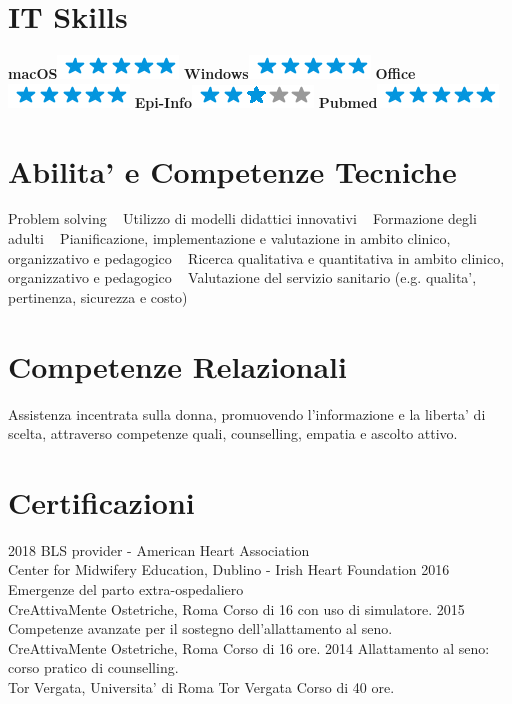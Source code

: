 \documentclass[11pt]{friggeri-cv}
\begin{document}
\begin{aside}
	\section{IT Skills}
	\textbf{macOS}\includegraphics[scale=0.40]{img/5stars.png}
	\textbf{Windows}\includegraphics[scale=0.40]{img/5stars.png}
	\textbf{Office}\includegraphics[scale=0.40]{img/5stars.png}
	\textbf{Epi-Info}\includegraphics[scale=0.40]{img/3stars.png}
	\textbf{Pubmed}\includegraphics[scale=0.40]{img/5stars.png}
  \section{Abilita' e Competenze Tecniche}
  \small Problem solving 
    ~
    Utilizzo di modelli didattici innovativi
    ~
    Formazione degli adulti
    ~
    Pianificazione, implementazione e valutazione in ambito clinico, organizzativo e 
    pedagogico 
    ~
    Ricerca qualitativa e quantitativa in ambito clinico, organizzativo e pedagogico 
    ~
    Valutazione del servizio sanitario (e.g. qualita', pertinenza, sicurezza e costo)
	\section{Competenze Relazionali}
  \small Assistenza incentrata sulla donna, promuovendo l'informazione e la liberta' 
  di scelta, attraverso competenze quali, counselling, empatia e ascolto attivo.
\end{aside}


\section{Certificazioni}
\begin{entrylist}
  \entry
    {2018}
    {BLS provider - American Heart Association}
    {\\Center for Midwifery Education, Dublino - Irish Heart Foundation}
    {}
  \entry
	  {2016}
	  {Emergenze del parto extra-ospedaliero}
	  {\\CreAttivaMente Ostetriche, Roma}
	  {Corso di 16 con uso di simulatore.}
  \entry
	  {2015}
	  {Competenze avanzate per il sostegno dell’allattamento al seno.}
	  {\\CreAttivaMente Ostetriche, Roma }
	  {Corso di 16 ore.}
  \entry
  {2014}
  {Allattamento al seno: corso pratico di counselling.}
  {\\Tor Vergata, Universita' di Roma Tor Vergata}
  {Corso di 40 ore.}
\end{entrylist}
\end{document}
